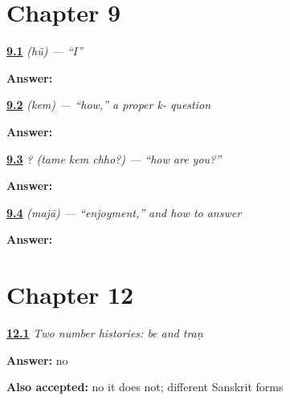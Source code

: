 \section*{Chapter 9}

\noindent\begin{minipage}[t]{\linewidth}
\raggedright
\hyperlink{review-GU-C03-hun-ya-retrieval}{\textbf{9.1}} \emph{ (hũ) — \textquotedblleft{}I\textquotedblright{}}\par
\small \textbf{Answer:} \par
\end{minipage}\par\medskip

\noindent\begin{minipage}[t]{\linewidth}
\raggedright
\hyperlink{review-GU-C03-kem-bha-retrieval}{\textbf{9.2}} \emph{ (kem) — \textquotedblleft{}how,\textquotedblright{} a proper k- question}\par
\small \textbf{Answer:} \par
\end{minipage}\par\medskip

\noindent\begin{minipage}[t]{\linewidth}
\raggedright
\hyperlink{review-GU-C03-tame-kem-chho-dha-retrieval}{\textbf{9.3}} \emph{  ? (tame kem chho?) — \textquotedblleft{}how are you?\textquotedblright{}}\par
\small \textbf{Answer:} \par
\end{minipage}\par\medskip

\noindent\begin{minipage}[t]{\linewidth}
\raggedright
\hyperlink{review-GU-C03-majaa-vocalic-r-retrieval}{\textbf{9.4}} \emph{ (majā) — \textquotedblleft{}enjoyment,\textquotedblright{} and how to answer}\par
\small \textbf{Answer:} \par
\end{minipage}\par\medskip

\section*{Chapter 12}

\noindent\begin{minipage}[t]{\linewidth}
\raggedright
\hyperlink{review-GU-C06-number-histories-be-source}{\textbf{12.1}} \emph{Two number histories: \emph{be} and \emph{traṇ}}\par
\small \textbf{Answer:} no\par
\footnotesize \textbf{Also accepted:} no it does not; different Sanskrit forms
\end{minipage}\par\medskip

